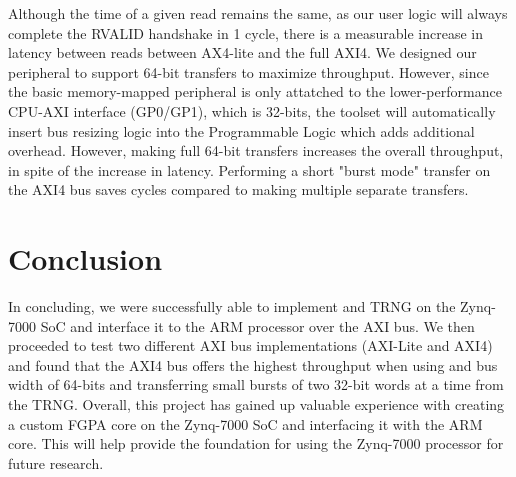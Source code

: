 \documentclass[journal]{IEEEtran}
\begin{document}
Although the time of a given read remains the same, as our user logic will always complete the RVALID handshake in 1 cycle, there is a measurable increase in latency between reads between AX4-lite and the full AXI4. We designed our peripheral to support 64-bit transfers to maximize throughput. However, since the basic memory-mapped peripheral is only attatched to the lower-performance CPU-AXI interface (GP0/GP1), which is 32-bits, the toolset will automatically insert bus resizing logic into the Programmable Logic which adds additional overhead. However, making full 64-bit transfers increases the overall throughput, in spite of the increase in latency. Performing a short "burst mode" transfer on the AXI4 bus saves cycles compared to making multiple separate transfers. 

\section{Conclusion}

In concluding, we were successfully able to implement and TRNG on the Zynq-7000 SoC and interface it to the ARM processor over the AXI bus. We then proceeded to test two different AXI bus implementations (AXI-Lite and AXI4) and found that the AXI4 bus offers the highest throughput when using and bus width of 64-bits and transferring small bursts of two 32-bit words at a time from the TRNG. Overall, this project has gained up valuable experience with creating a custom FGPA core on the Zynq-7000 SoC and interfacing it with the ARM core. This will help provide the foundation for using the Zynq-7000 processor for future research. 






\end{document}
